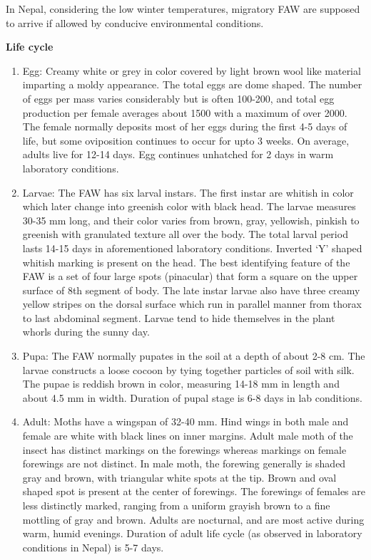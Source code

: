 \documentclass[
  openany]{book}
\begin{document}
In Nepal, considering the low winter temperatures, migratory FAW are supposed to arrive if allowed by conducive environmental conditions.

\textbf{Life cycle}

\begin{enumerate}
\def\labelenumi{\arabic{enumi}.}
\item
  Egg: Creamy white or grey in color covered by light brown wool like material imparting a moldy appearance. The total eggs are dome shaped. The number of eggs per mass varies considerably but is often 100-200, and total egg production per female averages about 1500 with a maximum of over 2000. The female normally deposits most of her eggs during the first 4-5 days of life, but some oviposition continues to occur for upto 3 weeks. On average, adults live for 12-14 days. Egg continues unhatched for 2 days in warm laboratory conditions.
\item
  Larvae: The FAW has six larval instars. The first instar are whitish in color which later change into greenish color with black head. The larvae measures 30-35 mm long, and their color varies from brown, gray, yellowish, pinkish to greenish with granulated texture all over the body. The total larval period lasts 14-15 days in aforementioned laboratory conditions. Inverted `Y' shaped whitish marking is present on the head. The best identifying feature of the FAW is a set of four large spots (pinacular) that form a square on the upper surface of 8th segment of body. The late instar larvae also have three creamy yellow stripes on the dorsal surface which run in parallel manner from thorax to last abdominal segment. Larvae tend to hide themselves in the plant whorls during the sunny day.
\item
  Pupa: The FAW normally pupates in the soil at a depth of about 2-8 cm. The larvae constructs a loose cocoon by tying together particles of soil with silk. The pupae is reddish brown in color, measuring 14-18 mm in length and about 4.5 mm in width. Duration of pupal stage is 6-8 days in lab conditions.
\item
  Adult: Moths have a wingspan of 32-40 mm. Hind wings in both male and female are white with black lines on inner margins. Adult male moth of the insect has distinct markings on the forewings whereas markings on female forewings are not distinct. In male moth, the forewing generally is shaded gray and brown, with triangular white spots at the tip. Brown and oval shaped spot is present at the center of forewings. The forewings of females are less distinctly marked, ranging from a uniform grayish brown to a fine mottling of gray and brown. Adults are nocturnal, and are most active during warm, humid evenings. Duration of adult life cycle (as observed in laboratory conditions in Nepal) is 5-7 days.
\end{enumerate}
\end{document}

